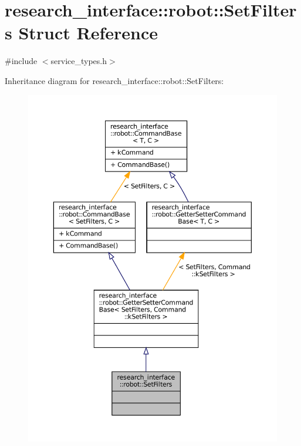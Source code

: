 \hypertarget{structresearch__interface_1_1robot_1_1SetFilters}{}\section{research\+\_\+interface\+:\+:robot\+:\+:Set\+Filters Struct Reference}
\label{structresearch__interface_1_1robot_1_1SetFilters}


{\ttfamily \#include $<$service\+\_\+types.\+h$>$}



Inheritance diagram for research\+\_\+interface\+:\+:robot\+:\+:Set\+Filters\+:
\nopagebreak
\begin{figure}[H]
\begin{center}
\leavevmode
\includegraphics[width=350pt]{structresearch__interface_1_1robot_1_1SetFilters__inherit__graph}
\end{center}
\end{figure}


